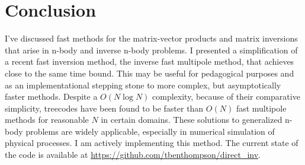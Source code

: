 \documentclass[10pt]{article}
\begin{document}
\section*{Conclusion}
I've discussed fast methods for the matrix-vector products and matrix inversions that arise in n-body and inverse n-body problems. I presented a simplification of a recent fast inversion method, the inverse fast multipole method, that achieves close to the same time bound. This may be useful for pedagogical purposes and as an implementational stepping stone to more complex, but asymptotically faster methods. Despite a $O(N\log{N})$ complexity, because of their comparative simplicity, treecodes have been found to be faster than $O(N)$ fast multipole methods for reasonable $N$ in certain domains. These solutions to generalized n-body problems are widely applicable, especially in numerical simulation of physical processes. I am actively implementing this method. The current state of the code is available at \url{https://github.com/tbenthompson/direct\_inv}. 
\end{document}
